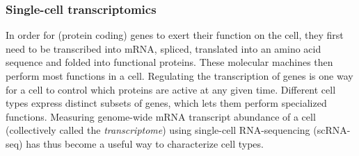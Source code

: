 \subsubsection{Single-cell transcriptomics}

In order for (protein coding) genes to exert their function on the cell, they first need to be transcribed into mRNA, spliced, translated into an amino acid sequence and folded into functional proteins. These molecular machines then perform most functions in a cell. Regulating the transcription of genes is one way for a cell to control which proteins are active at any given time. Different cell types express distinct subsets of genes, which lets them perform specialized functions. Measuring genome-wide mRNA transcript abundance of a cell (collectively called the \textit{transcriptome}) using single-cell RNA-sequencing (scRNA-seq) has thus become a useful way to characterize cell types. 

